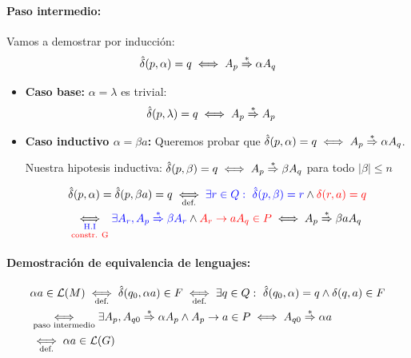 \paragraph{Paso intermedio:} Vamos a demostrar por inducción: \[ \hat\delta(p,\alpha) = q \iff A_p \deriva \alpha A_q\]

\begin{itemize}
  \item \textbf{Caso base:} \(\alpha = \lambda\) es trivial:
        \begin{align*}
           & \hat\delta(p,\lambda) = q \iff A_p \deriva A_p
        \end{align*}
  \item \textbf{Caso inductivo \(\alpha = \beta a\):} Queremos probar que \(\hat\delta(p,\alpha) = q \iff A_p \deriva \alpha A_q\).

        Nuestra hipotesis inductiva: \(\hat\delta(p,\beta) = q \iff A_p \deriva \beta A_q\) para todo \(|\beta| \leq n\)

        \begin{align*}
           & \hat\delta(p, \alpha) = \hat\delta(p, \beta a) = q \iffa{def.}\blue{\exists r\in Q:~\hat\delta(p,\beta) = r} \land \red{\delta(r, a) = q}          \\
           & \iffab{\blue{H.I}}{\red{constr. G}} \blue{\exists A_r, A_p \deriva \beta A_r} \land \red{A_r \rightarrow a A_q \in P} \iff A_p \deriva \beta a A_q \\
        \end{align*}
\end{itemize}

\paragraph{Demostración de equivalencia de lenguajes:}
\begin{align*}
   & \alpha a\in\mathcal{L}(M) \iffa{def.} \hat\delta(q_0, \alpha a) \in F \iffa{def.} \exists q\in Q:~\hat\delta(q_0, \alpha) = q \land \delta(q,a)\in F \\
   & \underset{\text{paso intermedio}}{\iff} \exists A_p, A_{q0} \deriva \alpha A_p \land A_p \rightarrow a \in P \iff A_{q0} \deriva \alpha a            \\
   & \underset{\text{def.}}{\iff} \alpha a \in\mathcal{L}(G)
\end{align*}
